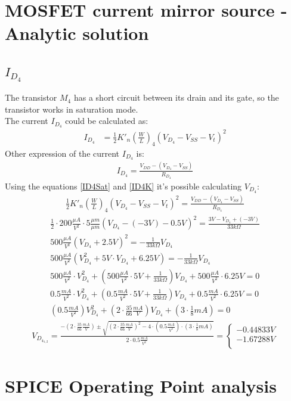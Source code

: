 \documentclass[10pt,a4paper]{book}
\begin{document}
\section{MOSFET current mirror source - Analytic solution}
\subsection{$I_{D_4}$}
The transistor $M_4$ has a short circuit between its drain and its gate, so the transistor works in saturation mode.\\
The current $I_{D_4}$ could be calculated as:\\
\begin{align}
I_{D_4} &= \frac{1}{2}{K'}_n \left(\frac{W}{L}\right)_4 (V_{D_4} - V_{SS} - V_t)^2 \label{ID4Sat}
\end{align}
Other expression of the current $I_{D_4}$ is:\\
\begin{align}
I_{D_4} = \frac{V_{DD} -(V_{D_4} - V_{SS})}{R_{D_4}}\label{ID4K}
\end{align}
Using the equations \ref{ID4Sat} and \ref{ID4K} it's possible calculating $V_{D_4}$:\\
\begin{align}
\frac{1}{2}{K'}_n \left(\frac{W}{L}\right)_4 (V_{D_4} - V_{SS} - V_t)^2 = \frac{V_{DD} - (V_{D_4} - V_{SS})}{R_{D_4}}
\end{align}
\begin{align}
\frac{1}{2}\cdot 200 \frac{\mu A}{V^2} \cdot 5 \frac{\mu m}{\mu m} (V_{D_4} - (-3V) - 0.5V)^2 = \frac{3V - V_{D_4} + (-3V)}{33k\Omega}\\
500 \frac{\mu A}{V^2} (V_{D_4} +2.5V)^2 = -\frac{1}{33k\Omega}V_{D_4}\\
500 \frac{\mu A}{V^2} (V_{D_4}^2+5V\cdot V_{D_4} +6.25V) = -\frac{1}{33k\Omega}V_{D_4}\\
500 \frac{\mu A}{V^2} \cdot V_{D_4}^2 + \left(500 \frac{\mu A}{V^2} \cdot 5V + \frac{1}{33k\Omega}\right) V_{D_4} + 500 \frac{\mu A}{V^2} \cdot 6.25V = 0\\
0.5 \frac{mA}{V^2} \cdot V_{D_4}^2 + \left(0.5 \frac{mA}{V^2} \cdot 5V + \frac{1}{33k\Omega}\right) V_{D_4} + 0.5 \frac{mA}{V^2} \cdot 6.25V = 0\\
\left(0.5 \frac{mA}{V^2}\right) V_{D_4}^2 + \left(2\cdot\frac{35}{66}\frac{mA}{V}\right) V_{D_4} + \left(3\cdot\frac{1}{8}mA\right) = 0
\end{align}
\begin{align}
V_{D_{4_{1,2}}} = \frac{-\left(2\cdot\frac{35}{66}\frac{mA}{V}\right)\pm \sqrt{\left(2\cdot\frac{35}{66}\frac{mA}{V}\right)^2-4\cdot\left(0.5 \frac{mA}{V^2}\right)\cdot\left(3\cdot\frac{1}{8}mA\right)}}{2\cdot0.5 \frac{mA}{V^2}} = 
\left\{
\begin{array}{l}
-0.44833V\\
-1.67288V\\
\end{array}
\right.
\end{align}

\section{SPICE Operating Point analysis}


\end{document}
